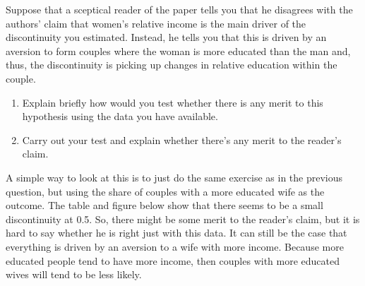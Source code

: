 \documentclass[a4paper, 11pt,addpoints]{exam}
\begin{document}
\begin{questions}
\begin{solution}
	
\end{solution}
\question[15] Suppose that a sceptical reader of the paper tells you that he disagrees with the authors' claim that women's relative income is the main driver of the discontinuity you estimated. Instead, he tells you that this is driven by an aversion to form couples where the woman is more educated than the man and, thus, the discontinuity is picking up changes in relative education within the couple.
\begin{enumerate}[label=(\alph*)]
\item Explain briefly how would you test whether there is any merit to this hypothesis using the data you have available. 
\item Carry out your test and explain whether there's any merit to the reader's claim.
\end{enumerate}
\begin{solution}
	A simple way to look at this is to just do the same exercise as in the previous question, but using the share of couples with a more educated wife as the outcome. The table and figure below show that there seems to be a small discontinuity at 0.5. So, there might be some merit to the reader's claim, but it is hard to say whether he is right just with this data. It can still be the case that everything is driven by an aversion to a wife with more income. Because more educated people tend to have more income, then couples with more educated wives will tend to be less likely. 
	
	
\end{solution}
\end{questions}

{}
\end{document}
